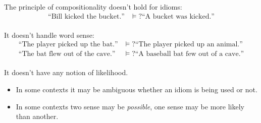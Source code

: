 \documentclass[11pt,letterpaper]{article}
\begin{document}
The principle of compositionality doesn't hold for idioms:
\begin{align*}
  \text{``Bill kicked the bucket.''} &\vDash? \text{``A bucket was kicked.''} \\
\end{align*}

It doesn't handle word sense:
\begin{align*}
  \text{``The player picked up the bat.''} &\vDash? \text{``The player picked up an animal.''} \\
  \text{``The bat flew out of the cave.''} &\vDash? \text{``A baseball bat few out of a cave.''} \\
\end{align*}

It doesn't have any notion of likelihood.  
\begin{itemize}
  \item In some contexts it may be ambiguous whether an idiom is being used or not.
  \item In some contexts two sense may be \textit{possible}, one sense may be more likely than another.
\end{itemize}
\end{document}
